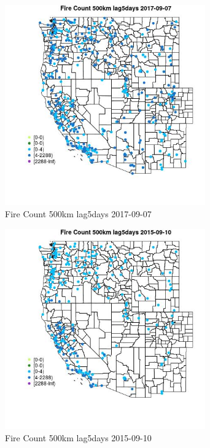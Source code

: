 \begin{figure} 
\centering  
\includegraphics[width=0.77\textwidth]{Code_Outputs/Report_ML_input_PM25_Step4_part_e_de_duplicated_aves_compiled_2019-05-21wNAs_MapObsFire_Count_500km_lag5days2017-09-07.jpg} 
\caption{\label{fig:Report_ML_input_PM25_Step4_part_e_de_duplicated_aves_compiled_2019-05-21wNAsMapObsFire_Count_500km_lag5days2017-09-07}Fire Count 500km lag5days 2017-09-07} 
\end{figure} 
 

\begin{figure} 
\centering  
\includegraphics[width=0.77\textwidth]{Code_Outputs/Report_ML_input_PM25_Step4_part_e_de_duplicated_aves_compiled_2019-05-21wNAs_MapObsFire_Count_500km_lag5days2015-09-10.jpg} 
\caption{\label{fig:Report_ML_input_PM25_Step4_part_e_de_duplicated_aves_compiled_2019-05-21wNAsMapObsFire_Count_500km_lag5days2015-09-10}Fire Count 500km lag5days 2015-09-10} 
\end{figure} 
 

